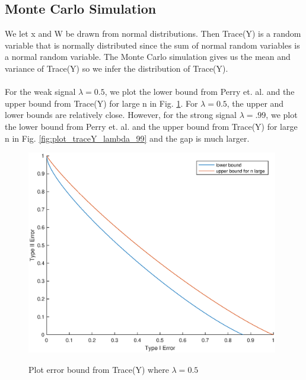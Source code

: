 \documentclass{article}
\begin{document}
\subsection*{Monte Carlo Simulation}

We let x and W be drawn from normal distributions. Then Trace(Y) is a random variable that is normally distributed since the sum of normal random variables is a normal random variable. The Monte Carlo simulation gives us the mean and variance of Trace(Y) so we infer the distribution of Trace(Y).\\
\\
For the weak signal $\lambda = 0.5$, we plot the lower bound from Perry et. al. \cite{perry} and the upper bound from Trace(Y) for large n in Fig. \ref{fig:plot_traceY_lambda_50}. For $\lambda = 0.5$, the upper and lower bounds are relatively close. However, for the strong signal $\lambda = .99$, we plot the lower bound from Perry et. al. \cite{perry} and the upper bound from Trace(Y) for large n in Fig. \ref{fig:plot_traceY_lambda_99} and the gap is much larger.

\begin{figure}
    \centering
    {\includegraphics[width=11cm]{plot_traceY_lambda_50.eps} }
    \caption{ Plot error bound from Trace(Y) where $\lambda = 0.5$}
	\label{fig:plot_traceY_lambda_50}
\end{figure}
\end{document}
